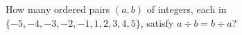 How many ordered pairs $(a,b)$ of integers, each in $\{-5,-4,-3,-2,-1,1,2,3,4,5\}$, satisfy $a\div b=b\div a$?
